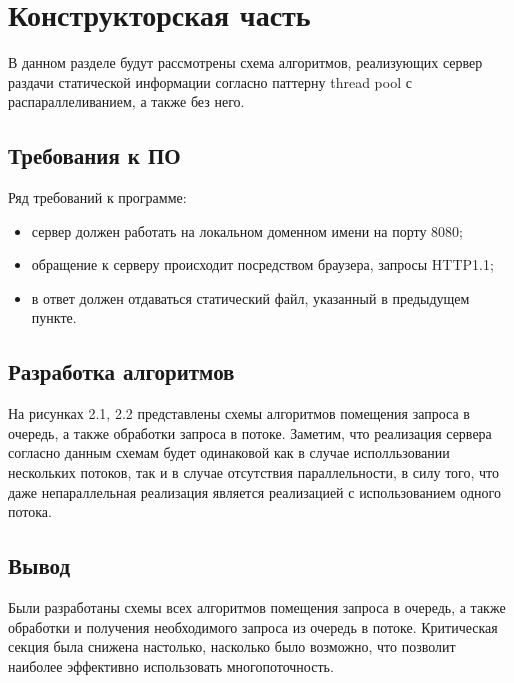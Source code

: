 \chapter{Конструкторская часть}
В данном разделе будут рассмотрены схема алгоритмов, реализующих сервер раздачи статической информации согласно паттерну thread pool с распараллеливанием, а также без него.

\section{Требования к ПО}
Ряд требований к программе:
\begin{itemize}
	\item сервер должен работать на локальном доменном имени на порту 8080;
    \item обращение к серверу происходит посредством браузера, запросы HTTP1.1;
    \item в ответ должен отдаваться статический файл, указанный в предыдущем пункте.\newline
\end{itemize}

\section{Разработка алгоритмов}
На рисунках 2.1, 2.2 представлены схемы алгоритмов помещения запроса в очередь, а также обработки запроса в потоке.
Заметим, что реализация сервера согласно данным схемам будет одинаковой как в случае исполльзовании нескольких потоков, так и в случае отсутствия параллельности, в силу того, что даже непараллельная реализация является реализацией с использованием одного потока.

\clearpage

\section*{Вывод}

Были разработаны схемы всех алгоритмов помещения запроса в очередь, а также обработки и получения необходимого запроса из очередь в потоке. Критическая секция была снижена настолько, насколько было возможно, что позволит наиболее эффективно использовать многопоточность.

